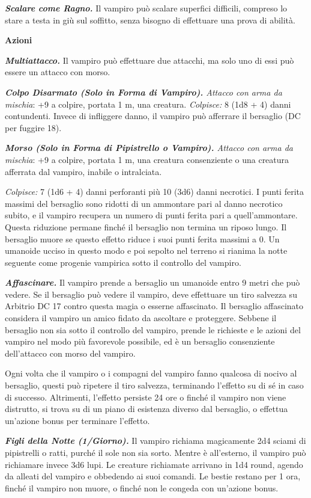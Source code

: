 \begin{multicols}{2}
\emph{\textbf{Scalare come Ragno.}} Il vampiro può scalare superfici
difficili, compreso lo stare a testa in giù sul soffitto, senza bisogno
di effettuare una prova di abilità.

\smallskip\textbf{Azioni}

\emph{\textbf{Multiattacco.}} Il vampiro può effettuare due attacchi, ma
solo uno di essi può essere un attacco con morso.

\emph{\textbf{Colpo Disarmato (Solo in Forma di Vampiro).} Attacco con
arma da mischia}: +9 a colpire, portata 1 m, una creatura.
\emph{Colpisce:} 8 (1d8 + 4) danni contundenti. Invece di infliggere
danno, il vampiro può afferrare il bersaglio (DC per fuggire 18).

\emph{\textbf{Morso (Solo in Forma di Pipistrello o Vampiro).} Attacco
con arma da mischia}: +9 a colpire, portata 1 m, una creatura
consenziente o una creatura afferrata dal vampiro, inabile o
intralciata.

\emph{Colpisce:} 7 (1d6 + 4) danni perforanti più 10 (3d6) danni
necrotici. I punti ferita massimi del bersaglio sono ridotti di un
ammontare pari al danno necrotico subito, e il vampiro recupera un
numero di punti ferita pari a quell'ammontare. Questa riduzione permane
finché il bersaglio non termina un riposo lungo. Il bersaglio muore se
questo effetto riduce i suoi punti ferita massimi a 0. Un umanoide
ucciso in questo modo e poi sepolto nel terreno si rianima la notte
seguente come progenie vampirica sotto il controllo del vampiro.

\emph{\textbf{Affascinare.}} Il vampiro prende a bersaglio un umanoide
entro 9 metri che può vedere. Se il bersaglio può vedere il vampiro,
deve effettuare un tiro salvezza su Arbitrio DC 17 contro questa magia o
esserne affascinato. Il bersaglio affascinato considera il vampiro un
amico fidato da ascoltare e proteggere. Sebbene il bersaglio non sia
sotto il controllo del vampiro, prende le richieste e le azioni del
vampiro nel modo più favorevole possibile, ed è un bersaglio
consenziente dell'attacco con morso del vampiro.

Ogni volta che il vampiro o i compagni del vampiro fanno qualcosa di
nocivo al bersaglio, questi può ripetere il tiro salvezza, terminando
l'effetto su di sé in caso di successo. Altrimenti, l'effetto persiste
24 ore o finché il vampiro non viene distrutto, si trova su di un piano
di esistenza diverso dal bersaglio, o effettua un'azione bonus per
terminare l'effetto.

\emph{\textbf{Figli della Notte (1/Giorno).}} Il vampiro richiama
magicamente 2d4 sciami di pipistrelli o ratti, purché il sole non sia
sorto. Mentre è all'esterno, il vampiro può richiamare invece 3d6 lupi.
Le creature richiamate arrivano in 1d4 round, agendo da alleati del
vampiro e obbedendo ai suoi comandi. Le bestie restano per 1 ora, finché
il vampiro non muore, o finché non le congeda con un'azione bonus.


\end{multicols}
